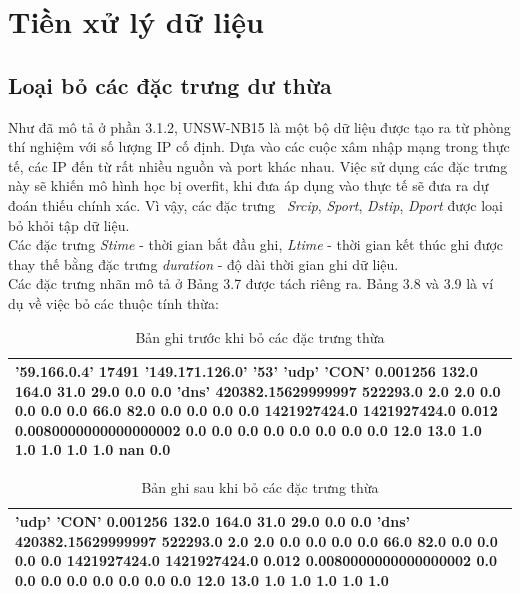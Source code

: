 \section{Tiền xử lý dữ liệu}
\subsection{Loại bỏ các đặc trưng dư thừa}
Như đã mô tả ở phần 3.1.2, UNSW-NB15 là một bộ dữ liệu được tạo ra từ phòng thí nghiệm với số lượng IP cố định. Dựa vào các cuộc xâm nhập mạng trong thực tế, các IP đến từ rất nhiều nguồn và port khác nhau. Việc sử dụng các đặc trưng này sẽ khiến mô hình học bị overfit, khi đưa áp dụng vào thực tế sẽ đưa ra dự đoán thiếu chính xác. Vì vậy, các đặc trưng \ \textit{Srcip}, \textit{Sport}, \textit{Dstip}, \textit{Dport} được loại bỏ khỏi tập dữ liệu.\\
Các đặc trưng \textit{Stime} - thời gian bắt đầu ghi, \textit{Ltime} - thời gian kết thúc ghi được thay thế bằng đặc trưng \textit{duration} - độ dài thời gian ghi dữ liệu.\\
Các đặc trưng nhãn mô tả ở Bảng 3.7 được tách riêng ra.
Bảng 3.8 và 3.9 là ví dụ về việc bỏ các thuộc tính thừa:
\begin{table}[H]
    \centering
    \begin{tabular}{|m{8cm}|}
    \hline
         '59.166.0.4' 17491 '149.171.126.0' '53' 'udp' 'CON' 0.001256 132.0 164.0 31.0 29.0 0.0 0.0 'dns' 420382.15629999997 522293.0 2.0 2.0 0.0 0.0 0.0  0.0 66.0 82.0 0.0 0.0 0.0 0.0 1421927424.0 1421927424.0 0.012 0.0080000000000000002 0.0 0.0 0.0 0.0 0.0 0.0 0.0 0.0 12.0 13.0 1.0 1.0 1.0 1.0 1.0 nan 0.0\\
         \hline
    \end{tabular}
    \caption{Bản ghi trước khi bỏ các đặc trưng thừa}
\end{table}

\begin{table}[H]
    \centering
    \begin{tabular}{|m{14cm}|}
    \hline
         'udp' 'CON' 0.001256 132.0 164.0 31.0 29.0 0.0 0.0 'dns' 420382.15629999997 522293.0 2.0 2.0 0.0 0.0 0.0  0.0 66.0 82.0 0.0 0.0 0.0 0.0 1421927424.0 1421927424.0 0.012 0.0080000000000000002 0.0 0.0 0.0 0.0 0.0 0.0 0.0 0.0 12.0 13.0 1.0 1.0 1.0 1.0 1.0\\
         \hline
    \end{tabular}
    \caption{Bản ghi sau khi bỏ các đặc trưng thừa}
\end{table}
